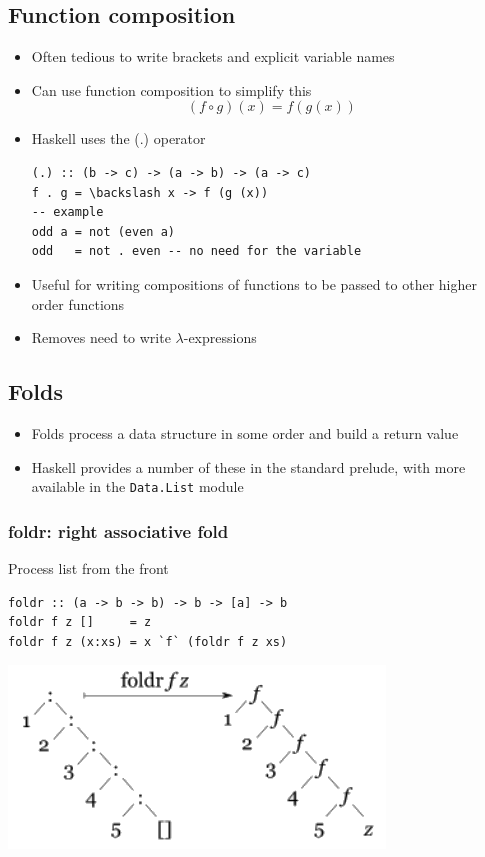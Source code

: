 \documentclass{article}[18pt]
\begin{document}
\subsection{Function composition}
\begin{itemize}
	\item Often tedious to write brackets and explicit variable names
	\item Can use function composition to simplify this
$$(f \circ g)(x) = f(g(x))$$
	\item Haskell uses the (.) operator
\begin{verbatim}
(.) :: (b -> c) -> (a -> b) -> (a -> c)
f . g = \backslash x -> f (g (x))
-- example
odd a = not (even a)
odd   = not . even -- no need for the variable
\end{verbatim}
	\item Useful for writing compositions of functions to be passed to other higher order functions
	\item Removes need to write $\lambda$-expressions
\end{itemize}
\subsection{Folds}
\begin{itemize}
	\item Folds process a data structure in some order and build a return value
	\item Haskell provides a number of these in the standard prelude, with more available in the \texttt{Data.List} module
\end{itemize}
\subsubsection{foldr: right associative fold}
Process list from the front
\begin{verbatim}
foldr :: (a -> b -> b) -> b -> [a] -> b
foldr f z []     = z
foldr f z (x:xs) = x `f` (foldr f z xs)
\end{verbatim}
\begin{center}
	\includegraphics[scale=0.8]{foldr}
\end{center}
\end{document}
